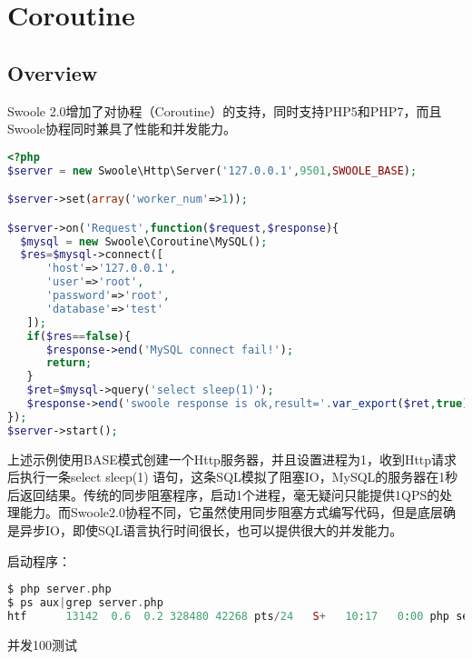 \part{Coroutine}

\chapter{Overview}


Swoole 2.0增加了对协程（Coroutine）的支持，同时支持PHP5和PHP7，而且Swoole协程同时兼具了性能和并发能力。



\begin{lstlisting}[language=PHP]
<?php
$server = new Swoole\Http\Server('127.0.0.1',9501,SWOOLE_BASE);

$server->set(array('worker_num'=>1));

$server->on('Request',function($request,$response){
  $mysql = new Swoole\Coroutine\MySQL();
  $res=$mysql->connect([
      'host'=>'127.0.0.1',
      'user'=>'root',
      'password'=>'root',
      'database'=>'test'
   ]);
   if($res==false){
      $response->end('MySQL connect fail!');
      return;
   }
   $ret=$mysql->query('select sleep(1)');
   $response->end('swoole response is ok,result='.var_export($ret,true));
});
$server->start();
\end{lstlisting}

上述示例使用BASE模式创建一个Http服务器，并且设置进程为1，收到Http请求后执行一条select sleep(1) 语句，这条SQL模拟了阻塞IO，MySQL的服务器在1秒后返回结果。传统的同步阻塞程序，启动1个进程，毫无疑问只能提供1QPS的处理能力。而Swoole2.0协程不同，它虽然使用同步阻塞方式编写代码，但是底层确是异步IO，即使SQL语言执行时间很长，也可以提供很大的并发能力。


启动程序：

\begin{lstlisting}[language=PHP]
$ php server.php
$ ps aux|grep server.php
htf      13142  0.6  0.2 328480 42268 pts/24   S+   10:17   0:00 php server.php
\end{lstlisting}

并发100测试



